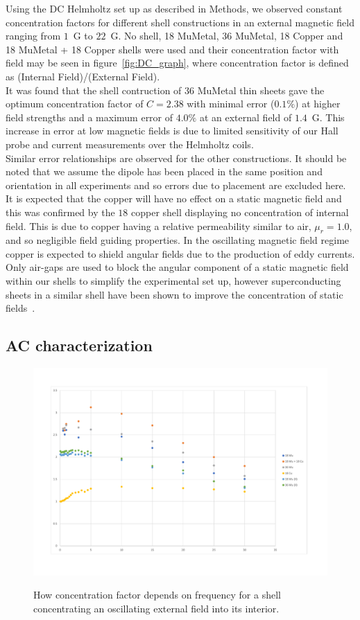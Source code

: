 \documentclass[11pt]{iopart}
\begin{document}
Using the DC Helmholtz set up as described in Methods, we observed
constant concentration factors for different shell constructions in an
external magnetic field ranging from $1$~G to $22$~G. No shell, 18
MuMetal, 36 MuMetal, 18 Copper and 18 MuMetal + 18 Copper shells were
used and their concentration factor with field may be seen in
figure~\ref{fig:DC_graph}, where concentration factor is defined as
(Internal Field)/(External Field). \\ It was found that the shell
contruction of 36 MuMetal thin sheets gave the optimum concentration
factor of $C = 2.38$ with minimal error ($0.1\%$) at higher field
strengths and a maximum error of $4.0\%$ at an external field of
$1.4$~G. This increase in error at low magnetic fields is due to
limited sensitivity of our Hall probe and current measurements over
the Helmholtz coils.\\ Similar error relationships are observed for
the other constructions. It should be noted that we assume the dipole
has been placed in the same position and orientation in all
experiments and so errors due to placement are excluded here.\\ It is
expected that the copper will have no effect on a static magnetic
field and this was confirmed by the $18$ copper shell displaying no
concentration of internal field.  This is due to copper having a
relative permeability similar to air, $\mu_r = 1.0$, and so negligible
field guiding properties. In the oscillating magnetic field regime
copper is expected to shield angular fields due to the production of
eddy currents. Only air-gaps are used to block the angular component
of a static magnetic field within our shells to simplify the
experimental set up, however superconducting sheets in a similar shell
have been shown to improve the concentration of static
fields~\cite{PRATT}.\\

\subsection{AC characterization}

\begin{figure}
  \begin{center}
   \noindent\includegraphics[width=0.75\linewidth]{images/AC-Helm.pdf}
  \label{fig:AC_helm_graph}
  \end{center}
  \caption{How concentration factor depends on frequency for a shell
    concentrating an oscillating external field into its interior.}
\end{figure}
\end{document}
